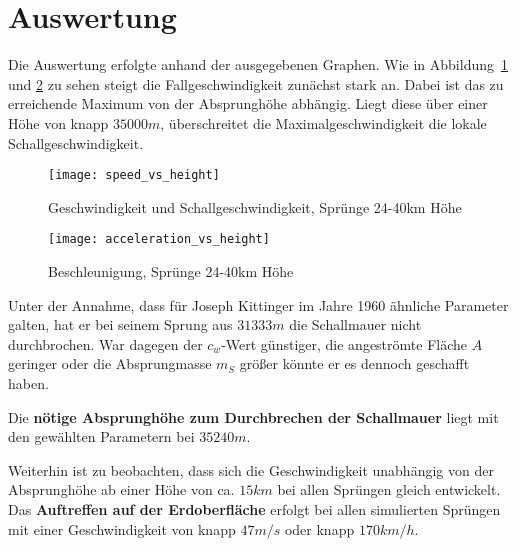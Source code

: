 \section{Auswertung}\label{sec:auswertung}

Die Auswertung erfolgte anhand der ausgegebenen Graphen.
Wie in Abbildung~\ref{fig:speed_vs_height} und \ref{fig:acceleration_vs_height} zu sehen steigt die Fallgeschwindigkeit zunächst stark an.
Dabei ist das zu erreichende Maximum von der Absprunghöhe abhängig.
Liegt diese über einer Höhe von knapp $35000m$, überschreitet die Maximalgeschwindigkeit die lokale Schallgeschwindigkeit.

\begin{figure}[h]
  \centering
  \texttt{[image: speed\_vs\_height]}
  \caption{Geschwindigkeit und Schallgeschwindigkeit, Sprünge 24-40km Höhe}
  \label{fig:speed_vs_height}
\end{figure}

\begin{figure}[h]
  \centering
  \texttt{[image: acceleration\_vs\_height]}
  \caption{Beschleunigung, Sprünge 24-40km Höhe}
  \label{fig:acceleration_vs_height}
\end{figure}

Unter der Annahme, dass für Joseph Kittinger im Jahre 1960 ähnliche Parameter galten, hat er bei seinem Sprung aus $31333m$ die Schallmauer nicht durchbrochen.
War dagegen der $c_w$-Wert günstiger, die angeströmte Fläche $A$ geringer oder die Absprungmasse $m_S$ größer könnte er es dennoch geschafft haben.

Die \textbf{nötige Absprunghöhe zum Durchbrechen der Schallmauer} liegt mit den gewählten Parametern bei $35240m$.

Weiterhin ist zu beobachten, dass sich die Geschwindigkeit unabhängig von der Absprunghöhe ab einer Höhe von ca. $15km$ bei allen Sprüngen gleich entwickelt.
Das \textbf{Auftreffen auf der Erdoberfläche} erfolgt bei allen simulierten Sprüngen mit einer Geschwindigkeit von knapp $47m/s$ oder knapp $170km/h$.
